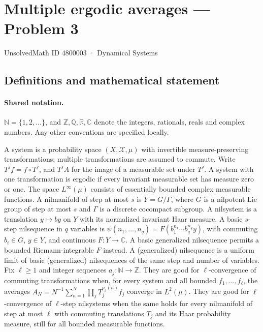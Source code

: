 \documentclass[11pt]{article}
\begin{document}
\setcounter{section}{4800002}
\section{Multiple ergodic averages — Problem 3}\label{4800003}
{\small\sffamily UnsolvedMath ID 4800003 · Dynamical Systems}
\subsection{Definitions and mathematical statement}

\paragraph{Shared notation.}$\mathbb N=\{1,2,\ldots\}$, and $\mathbb Z,\mathbb Q,\mathbb R,\mathbb C$ denote the integers, rationals, reals and complex numbers. Any other conventions are specified locally.


A system is a probability space $(X,\mathcal X,\mu)$ with invertible measure-preserving transformations; multiple transformations are assumed to commute. Write $T^j f=f\circ T^j$, and $T^j A$ for the image of a measurable set under $T^j$. A system with one transformation is ergodic if every invariant measurable set has measure zero or one. The space $L^\infty(\mu)$ consists of essentially bounded complex measurable functions. A nilmanifold of step at most $s$ is $Y=G/\Gamma$, where $G$ is a nilpotent Lie group of step at most $s$ and $\Gamma$ is a discrete cocompact subgroup. A nilsystem is a translation $y\mapsto by$ on $Y$ with its normalized invariant Haar measure. A basic $s$-step nilsequence in $q$ variables is $\psi(n_1,\ldots,n_q)=F(b_1^{n_1}\cdots b_q^{n_q}y)$, with commuting $b_i\in G$, $y\in Y$, and continuous $F:Y\to\mathbb C$. A basic generalized nilsequence permits a bounded Riemann-integrable $F$ instead. A (generalized) nilsequence is a uniform limit of basic (generalized) nilsequences of the same step and number of variables. Fix $\ell\ge1$ and integer sequences $a_j:\mathbb N\to\mathbb Z$. They are good for $\ell$-convergence of commuting transformations when, for every system and all bounded $f_1,\ldots,f_\ell$, the averages $A_N=N^{-1}\sum_{n=1}^N\prod_jT_j^{a_j(n)}f_j$ converge in $L^2(\mu)$. They are good for $\ell$-convergence of $\ell$-step nilsystems when the same holds for every nilmanifold of step at most $\ell$ with commuting translations $T_j$ and its Haar probability measure, still for all bounded measurable functions.
\end{document}
